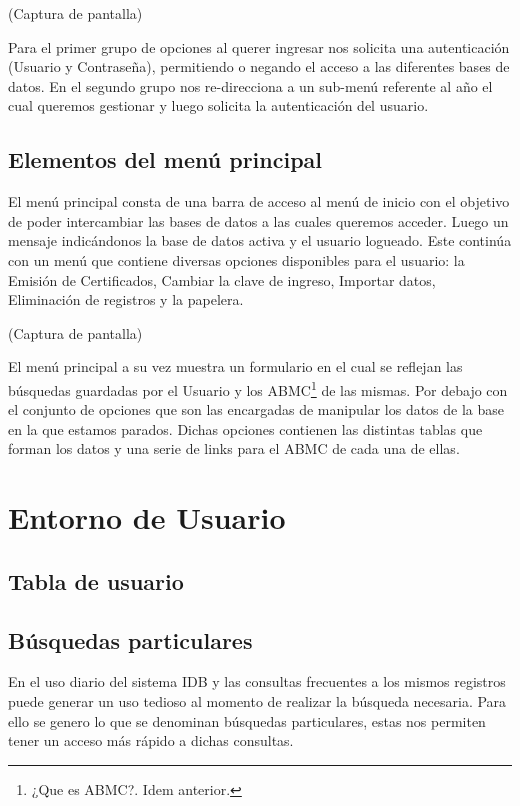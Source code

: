 \documentclass[a4paper,10pt]{article}
\begin{document}
(Captura de pantalla)

Para el primer grupo de opciones al querer ingresar nos solicita una autenticación (Usuario y Contraseña), permitiendo o negando el acceso a las diferentes bases de datos. En el segundo grupo nos re-direcciona a un sub-menú referente al año el cual queremos gestionar y luego solicita la autenticación del usuario. 
 
\subsection{Elementos del menú principal\label{ElementosDelMenuPrincipal}}

El menú principal consta de una barra de acceso al menú de inicio con el objetivo de poder intercambiar las bases de datos a las cuales queremos acceder. 
Luego un mensaje indicándonos la base de datos activa y el usuario logueado.
Este continúa con un menú que contiene diversas opciones disponibles para el usuario: la Emisión de Certificados, Cambiar la clave de ingreso, Importar datos, Eliminación de registros y la papelera.

(Captura de pantalla)

El menú principal a su vez muestra un formulario en el cual se reflejan las búsquedas guardadas por el Usuario y los ABMC\footnote{¿Que es ABMC?. Idem anterior.} de las mismas. Por debajo con el conjunto de opciones que son las encargadas de manipular los datos de la base en la que estamos parados.
Dichas opciones contienen las distintas tablas que forman los datos y una serie de links para el ABMC de cada una de ellas.



\section{Entorno de Usuario}
\subsection{Tabla de usuario}
\subsection{Búsquedas particulares}
En el uso diario del sistema IDB y las consultas frecuentes a los mismos registros puede generar un uso tedioso al momento de realizar la búsqueda necesaria. Para ello se genero lo que se denominan búsquedas particulares, estas nos permiten tener un acceso más rápido a dichas consultas.
\end{document}

